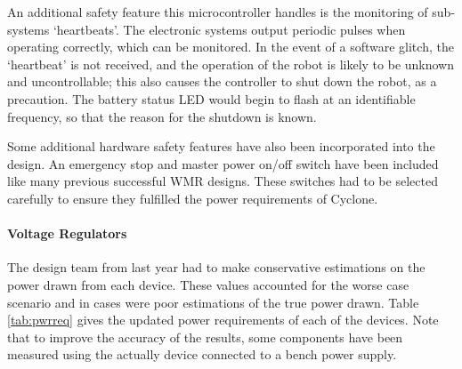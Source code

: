 An additional safety feature this microcontroller handles is the monitoring of sub-systems ‘heartbeats’. The electronic systems output periodic pulses when operating correctly, which can be monitored. In the event of a software glitch, the ‘heartbeat’ is not received, and the operation of the robot is likely to be unknown and uncontrollable; this also causes the controller to shut down the robot, as a precaution. The battery status LED would begin to flash at an identifiable frequency, so that the reason for the shutdown is known.\par

Some additional hardware safety features have also been incorporated into the design. An emergency stop and master power on/off switch have been included like many previous successful WMR designs. These switches had to be selected carefully to ensure they fulfilled the power requirements of Cyclone.\par

\paragraph{Voltage Regulators}
The design team from last year had to make conservative estimations on the power drawn from each device. These values accounted for the worse case scenario and in cases were poor estimations of the true power drawn. Table \ref{tab:pwrreq} gives the updated power requirements of each of the devices. Note that to improve the accuracy of the results, some components have been measured using the actually device connected to a bench power supply.\par

